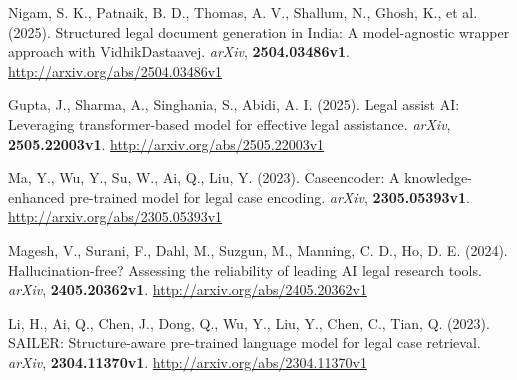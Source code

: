 \documentclass[conference]{IEEEtran}
\begin{document}
\begin{thebibliography}{99}

Nigam, S. K., Patnaik, B. D., Thomas, A. V., Shallum, N., Ghosh, K., et al. (2025). Structured legal document generation in India: A model-agnostic wrapper approach with VidhikDastaavej. \textit{arXiv}, \textbf{2504.03486v1}. 
\url{http://arxiv.org/abs/2504.03486v1}

Gupta, J., Sharma, A., Singhania, S., Abidi, A. I. (2025). Legal assist AI: Leveraging transformer-based model for effective legal assistance. \textit{arXiv}, \textbf{2505.22003v1}. 
\url{http://arxiv.org/abs/2505.22003v1}

Ma, Y., Wu, Y., Su, W., Ai, Q., Liu, Y. (2023). Caseencoder: A knowledge-enhanced pre-trained model for legal case encoding. \textit{arXiv}, \textbf{2305.05393v1}. 
\url{http://arxiv.org/abs/2305.05393v1}

Magesh, V., Surani, F., Dahl, M., Suzgun, M., Manning, C. D., Ho, D. E. (2024). Hallucination-free? Assessing the reliability of leading AI legal research tools. \textit{arXiv}, \textbf{2405.20362v1}. 
\url{http://arxiv.org/abs/2405.20362v1}

Li, H., Ai, Q., Chen, J., Dong, Q., Wu, Y., Liu, Y., Chen, C., Tian, Q. (2023). SAILER: Structure-aware pre-trained language model for legal case retrieval. \textit{arXiv}, \textbf{2304.11370v1}. 
\url{http://arxiv.org/abs/2304.11370v1}

\end{thebibliography}
\end{document}
